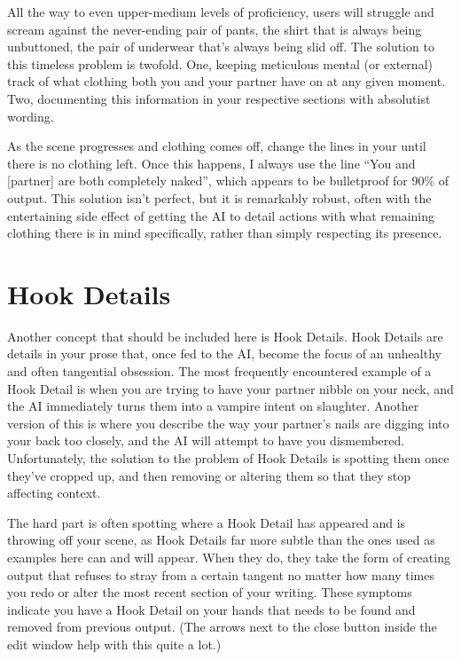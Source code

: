 \documentclass[Coomer-main.tex]{subfiles}
\begin{document}
All the way to even upper-medium levels of proficiency, users will struggle and scream against the never-ending pair of pants, the shirt that is always being unbuttoned, the pair of underwear that’s always being slid off.
The solution to this timeless problem is twofold.
One, keeping meticulous mental (or external) track of what clothing both you and your partner have on at any given moment.
Two, documenting this information in your respective \rem sections with absolutist wording.

As the scene progresses and clothing comes off, change the lines in your \rem until there is no clothing left.
Once this happens, I always use the line “You and [partner] are both completely naked”, which appears to be bulletproof for 90\% of output.
This solution isn’t perfect, but it is remarkably robust, often with the entertaining side effect of getting the AI to detail actions with what remaining clothing there is in mind specifically, rather than simply respecting its presence.

\section{Hook Details}

Another concept that should be included here is Hook Details.
Hook Details are details in your prose that, once fed to the AI, become the focus of an unhealthy and often tangential obsession.
The most frequently encountered example of a Hook Detail is when you are trying to have your partner nibble on your neck, and the AI immediately turns them into a vampire intent on slaughter.
Another version of this is where you describe the way your partner’s nails are digging into your back too closely, and the AI will attempt to have you dismembered.
Unfortunately, the solution to the problem of Hook Details is spotting them once they’ve cropped up, and then removing or altering them so that they stop affecting context.

The hard part is often spotting where a Hook Detail has appeared and is throwing off your scene, as Hook Details far more subtle than the ones used as examples here can and will appear.
When they do, they take the form of creating output that refuses to stray from a certain tangent no matter how many times you redo or alter the most recent section of your writing.
These symptoms indicate you have a Hook Detail on your hands that needs to be found and removed from previous output.
(The arrows next to the close button inside the edit window help with this quite a lot.)
\end{document}

